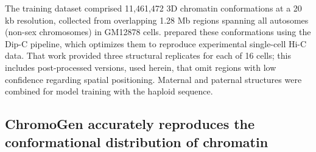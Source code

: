 \documentclass[12pt,letterpaper]{article}
\begin{document}
The training dataset comprised %
11,461,472 3D chromatin conformations at a 20 kb resolution, collected from overlapping 1.28 Mb regions spanning all autosomes (non-sex chromosomes) in GM12878 cells. 
\textcite{Tan2018} prepared these conformations using the Dip-C pipeline, which optimizes them to reproduce experimental single-cell Hi-C data. 
That work provided three structural replicates for each of 16 cells; this includes post-processed versions, used herein, that omit regions with low confidence regarding spatial positioning. 
Maternal and paternal structures were combined for model training with the haploid sequence.
\begin{comment}
\begin{figure}[t!]
    \texttt{[image: Figure1\_with\_Hi-C\_Distance.pdf]}
    \caption{
    \textbf{Illustration of the procedure followed by ChromoGen when making \emph{de novo} predictions of chromatin organization using sequence data.}
    Before structures are generated, DNA sequence and chromatin accessibility data are converted into numerical embeddings by EPCOT. 
    These embeddings are passed to a denoising diffusion probabilistic model, which uses a U-Net to gradually remove noise from a randomly generated distance map. 
    The U-Net receives both the distance map and embedding at each time step to generate region- and cell type-specific samples.  
    Finally, 3D coordinates are inferred from the fully denoised distance map. 
}
    \label{fig:design}
\end{figure}
\end{comment}

\subsection*{ChromoGen accurately reproduces the conformational distribution of chromatin}
\label{sec:results:unguided_ensemble}

\begin{comment}
To evaluate the quality of chromatin structures produced by ChromoGen, we constructed a predicted dataset by separately generating conformations for genomic regions selected throughout the genome following the procedure detailed in the \emph{Methods} section. 

We first combined all structures together to build the generic structural ensemble for chromatin. 
Statistics in this ensemble aligns with the general characteristics of chromatin conformations.   These properties are particularly intriguing from the standpoint of polymer physics, as they provide insights into the inherent topological complexities of this fundamental biological polymer \cite{Gro93,Lie09}. To assess the fidelity of the generated structures, we conducted a comparative analysis using several statistical metrics against Dip-C structures, as well as conformations generated by a homopolymer with a comparable level of compaction to chromatin.
\end{comment}
\end{document}
